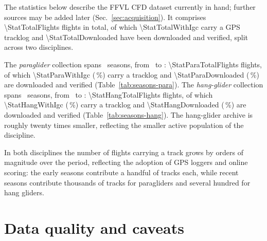 The statistics below describe the FFVL CFD dataset currently in hand; further sources may be
added later (Sec.~\ref{sec:acquisition}). It comprises \num{\StatTotalFlights} flights in
total, of which \num{\StatTotalWithIgc} carry a GPS tracklog and \num{\StatTotalDownloaded}
have been downloaded and verified, split across two disciplines.

The \emph{paraglider} collection spans \StatParaNumSeasons\ seasons, from
\StatParaSeasonFirst\ to \StatParaSeasonLast: \num{\StatParaTotalFlights} flights, of which
\num{\StatParaWithIgc} (\StatParaPctWithIgc\,\%) carry a tracklog and
\num{\StatParaDownloaded} (\StatParaPctDownloaded\,\%) are downloaded and verified
(Table~\ref{tab:seasons-para}). The \emph{hang-glider} collection spans \StatHangNumSeasons\
seasons, from \StatHangSeasonFirst\ to \StatHangSeasonLast: \num{\StatHangTotalFlights}
flights, of which \num{\StatHangWithIgc} (\StatHangPctWithIgc\,\%) carry a tracklog and
\num{\StatHangDownloaded} (\StatHangPctDownloaded\,\%) are downloaded and verified
(Table~\ref{tab:seasons-hang}). The hang-glider archive is roughly twenty times smaller,
reflecting the smaller active population of the discipline.

In both disciplines the number of flights carrying a track grows by orders of magnitude
over the period,
reflecting the adoption of GPS loggers and online scoring: the early seasons contribute a
handful of tracks each, while recent seasons contribute thousands of tracks for
paragliders and several hundred for hang gliders.




\section{Data quality and caveats}
\label{sec:dataquality}

